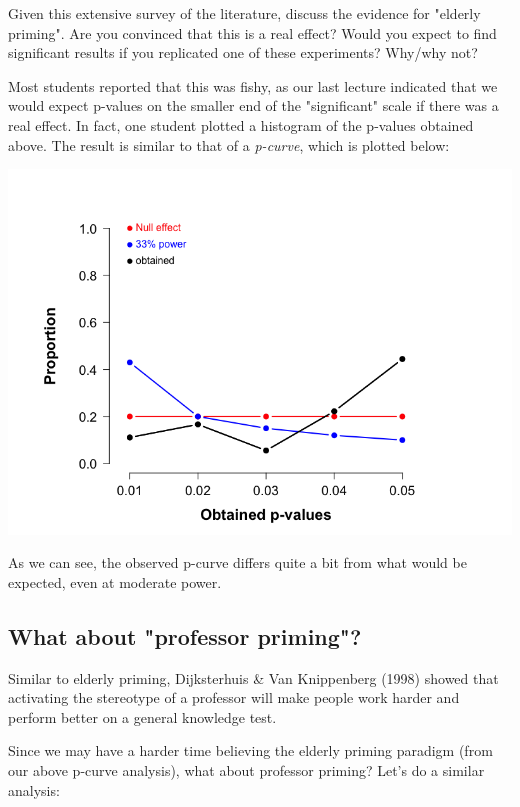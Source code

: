 \documentclass[article,10pt]{article}
\begin{document}
Given this extensive survey of the literature, discuss the evidence for "elderly priming".  Are you convinced that this is a real effect?  Would you expect to find significant results if you replicated one of these experiments?  Why/why not?

Most students reported that this was fishy, as our last lecture indicated that we would expect p-values on the smaller end of the "significant" scale if there was a real effect.  In fact, one student plotted a histogram of the p-values obtained above.  The result is similar to that of a \emph{p-curve}, which is plotted below:

\includegraphics[width=.9\linewidth]{figures/p-curve-elderly.png}

As we can see, the observed p-curve differs quite a bit from what would be expected, even at moderate power.

\subsection*{What about "professor priming"?}
\label{sec-1-2}

Similar to elderly priming, Dijksterhuis \& Van Knippenberg (1998) showed that activating the stereotype of a professor will make people work harder and perform better on a general knowledge test.

Since we may have a harder time believing the elderly priming paradigm (from our above p-curve analysis), what about professor priming?  Let's do a similar analysis:
\end{document}
